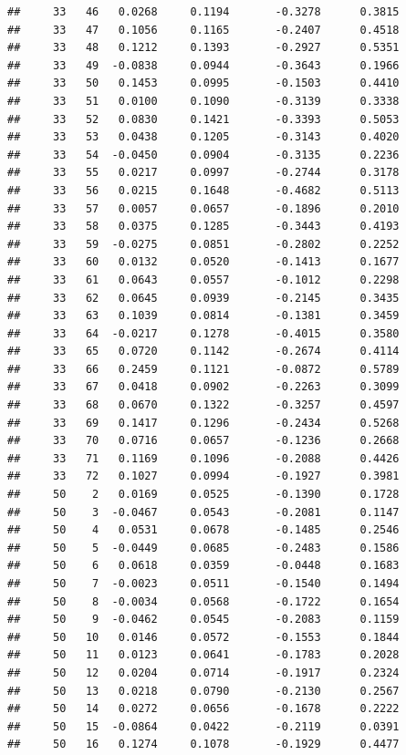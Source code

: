 \documentclass[
]{article}
\begin{document}
\begin{verbatim}
##     33   46   0.0268     0.1194       -0.3278      0.3815  
##     33   47   0.1056     0.1165       -0.2407      0.4518  
##     33   48   0.1212     0.1393       -0.2927      0.5351  
##     33   49  -0.0838     0.0944       -0.3643      0.1966  
##     33   50   0.1453     0.0995       -0.1503      0.4410  
##     33   51   0.0100     0.1090       -0.3139      0.3338  
##     33   52   0.0830     0.1421       -0.3393      0.5053  
##     33   53   0.0438     0.1205       -0.3143      0.4020  
##     33   54  -0.0450     0.0904       -0.3135      0.2236  
##     33   55   0.0217     0.0997       -0.2744      0.3178  
##     33   56   0.0215     0.1648       -0.4682      0.5113  
##     33   57   0.0057     0.0657       -0.1896      0.2010  
##     33   58   0.0375     0.1285       -0.3443      0.4193  
##     33   59  -0.0275     0.0851       -0.2802      0.2252  
##     33   60   0.0132     0.0520       -0.1413      0.1677  
##     33   61   0.0643     0.0557       -0.1012      0.2298  
##     33   62   0.0645     0.0939       -0.2145      0.3435  
##     33   63   0.1039     0.0814       -0.1381      0.3459  
##     33   64  -0.0217     0.1278       -0.4015      0.3580  
##     33   65   0.0720     0.1142       -0.2674      0.4114  
##     33   66   0.2459     0.1121       -0.0872      0.5789  
##     33   67   0.0418     0.0902       -0.2263      0.3099  
##     33   68   0.0670     0.1322       -0.3257      0.4597  
##     33   69   0.1417     0.1296       -0.2434      0.5268  
##     33   70   0.0716     0.0657       -0.1236      0.2668  
##     33   71   0.1169     0.1096       -0.2088      0.4426  
##     33   72   0.1027     0.0994       -0.1927      0.3981  
##     50    2   0.0169     0.0525       -0.1390      0.1728  
##     50    3  -0.0467     0.0543       -0.2081      0.1147  
##     50    4   0.0531     0.0678       -0.1485      0.2546  
##     50    5  -0.0449     0.0685       -0.2483      0.1586  
##     50    6   0.0618     0.0359       -0.0448      0.1683  
##     50    7  -0.0023     0.0511       -0.1540      0.1494  
##     50    8  -0.0034     0.0568       -0.1722      0.1654  
##     50    9  -0.0462     0.0545       -0.2083      0.1159  
##     50   10   0.0146     0.0572       -0.1553      0.1844  
##     50   11   0.0123     0.0641       -0.1783      0.2028  
##     50   12   0.0204     0.0714       -0.1917      0.2324  
##     50   13   0.0218     0.0790       -0.2130      0.2567  
##     50   14   0.0272     0.0656       -0.1678      0.2222  
##     50   15  -0.0864     0.0422       -0.2119      0.0391  
##     50   16   0.1274     0.1078       -0.1929      0.4477  

\end{verbatim}
\end{document}
